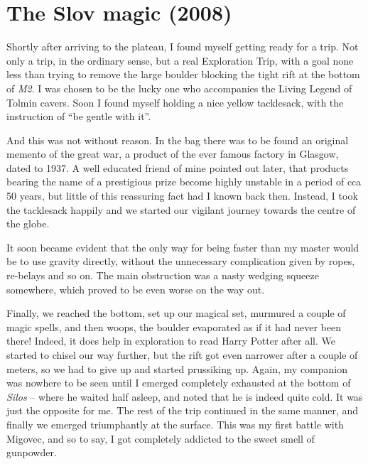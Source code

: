 \section{The Slov magic (2008)}

Shortly after arriving to the plateau, I found myself getting ready for
a trip. Not only a trip, in the ordinary sense, but a real Exploration
Trip, with a goal none less than trying to remove the large boulder
blocking the tight rift at the bottom of \emph{M2}. I was chosen to be
the lucky one who accompanies the Living Legend of Tolmin cavers. Soon I
found myself holding a nice yellow tacklesack, with the instruction of
``be gentle with it''.

And this was not without reason. In the bag there was to be found an
original memento of the great war, a product of the ever famous factory
in Glasgow, dated to 1937. A well educated friend of mine pointed out
later, that products bearing the name of a prestigious prize become
highly unstable in a period of cca 50 years, but little of this
reassuring fact had I known back then. Instead, I took the tacklesack
happily and we started our vigilant journey towards the centre of the
globe.

It soon became evident that the only way for being faster than my master
would be to use gravity directly, without the unnecessary complication
given by ropes, re-belays and so on. The main obstruction was a nasty
wedging squeeze somewhere, which proved to be even worse on the way out.

Finally, we reached the bottom, set up our magical set, murmured a
couple of magic spells, and then woops, the boulder evaporated as if it
had never been there! Indeed, it does help in exploration to read Harry
Potter after all. We started to chisel our way further, but the rift got
even narrower after a couple of meters, so we had to give up and started
prussiking up. Again, my companion was nowhere to be seen until I
emerged completely exhausted at the bottom of \emph{Silos} -- where he
waited half asleep, and noted that he is indeed quite cold. It was just
the opposite for me. The rest of the trip continued in the same manner,
and finally we emerged triumphantly at the surface. This was my first
battle with Migovec, and so to say, I got completely addicted to the
sweet smell of gunpowder.

